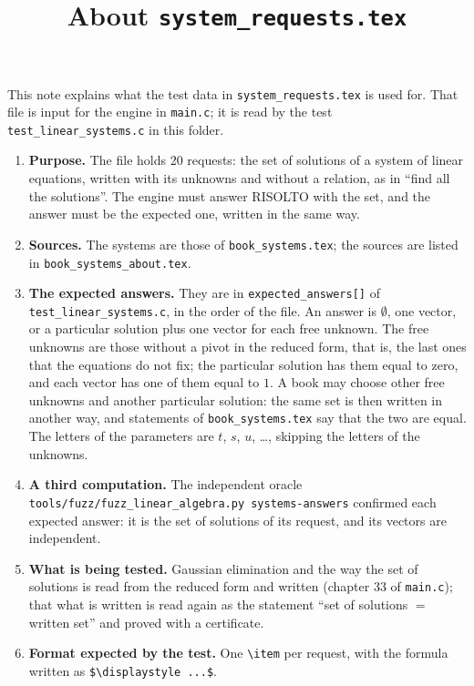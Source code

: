 \documentclass[11pt,a4paper]{article}
\title{About \texttt{system\_requests.tex}}
\author{}
\date{}
\begin{document}
\maketitle
This note explains what the test data in \texttt{system\_requests.tex} is used for. That file is input for the engine in \texttt{main.c}; it is read by the test \texttt{test\_linear\_systems.c} in this folder.

\begin{enumerate}
\item \textbf{Purpose.} The file holds 20 requests: the set of solutions of a system of linear equations, written with its unknowns and without a relation, as in ``find all the solutions''. The engine must answer RISOLTO with the set, and the answer must be the expected one, written in the same way.

\item \textbf{Sources.} The systems are those of \texttt{book\_systems.tex}; the sources are listed in \texttt{book\_systems\_about.tex}.

\item \textbf{The expected answers.} They are in \texttt{expected\_answers[]} of \texttt{test\_linear\_systems.c}, in the order of the file. An answer is $\emptyset$, one vector, or a particular solution plus one vector for each free unknown. The free unknowns are those without a pivot in the reduced form, that is, the last ones that the equations do not fix; the particular solution has them equal to zero, and each vector has one of them equal to $1$. A book may choose other free unknowns and another particular solution: the same set is then written in another way, and statements of \texttt{book\_systems.tex} say that the two are equal. The letters of the parameters are $t$, $s$, $u$, \dots, skipping the letters of the unknowns.

\item \textbf{A third computation.} The independent oracle \texttt{tools/fuzz/fuzz\_linear\_algebra.py systems-answers} confirmed each expected answer: it is the set of solutions of its request, and its vectors are independent.

\item \textbf{What is being tested.} Gaussian elimination and the way the set of solutions is read from the reduced form and written (chapter 33 of \texttt{main.c}); that what is written is read again as the statement ``set of solutions $=$ written set'' and proved with a certificate.

\item \textbf{Format expected by the test.} One \texttt{\textbackslash item} per request, with the formula written as \texttt{\$\textbackslash displaystyle ...\$}.


\end{enumerate}
\end{document}
